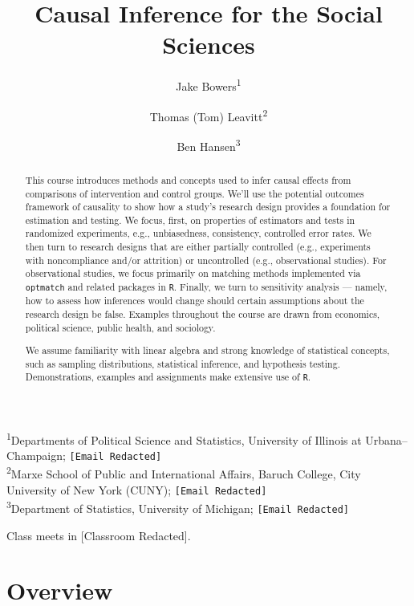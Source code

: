 \documentclass[12pt]{article}
\title{Causal Inference for the Social Sciences}
\author{%
  Jake Bowers\textsuperscript{1} \and
  Thomas (Tom) Leavitt\textsuperscript{2} \and
  Ben Hansen\textsuperscript{3}
}
\begin{document}
\pagestyle{myfancy}
\maketitle

\begin{center}\small
  \textsuperscript{1}Departments of Political Science and Statistics,
  University of Illinois at Urbana–Champaign; \texttt{[Email Redacted]}\\
  \textsuperscript{2}Marxe School of Public and International Affairs,
  Baruch College, City University of New York (CUNY); \texttt{[Email Redacted]}\\
  \textsuperscript{3}Department of Statistics,
  University of Michigan; \texttt{[Email Redacted]}
\end{center}

\begin{center}\small
  Class meets in [Classroom Redacted].
\end{center}

\begin{abstract}
\noindent This course introduces methods and concepts used to infer causal effects from comparisons of intervention and control groups. We'll use the potential outcomes framework of causality to show how a study's research design provides a foundation for estimation and testing. We focus, first, on properties of estimators and tests in randomized experiments, e.g., unbiasedness, consistency, controlled error rates. We then turn to research designs that are either partially controlled (e.g., experiments with noncompliance and/or attrition) or uncontrolled (e.g., observational studies). For observational studies, we focus primarily on matching methods implemented via \texttt{optmatch} and related packages in \texttt{R}. Finally, we turn to sensitivity analysis --- namely, how to assess how inferences would change should certain assumptions about the research design be false. Examples throughout the course are drawn from economics, political science, public health, and sociology.

We assume familiarity with linear algebra and strong knowledge of
statistical concepts, such as sampling distributions, statistical
inference, and hypothesis testing. Demonstrations, examples and
assignments make extensive use of \texttt{R}.
\end{abstract}

\clearpage

\section*{Overview}
\end{document}
